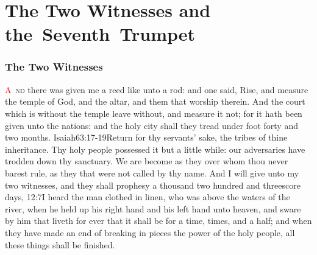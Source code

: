 
\chapter{The Two Witnesses and \linebreak[0] \mbox{the Seventh Trumpet}}
\subsection*{The Two Witnesses}
\lettrine[lines=3,slope=0.5em]{\textcolor{red}{A}}{\ nd} there was given me a reed like unto a rod:%
 and one said, Rise, and measure the temple of God, and the altar, and them that worship therein. 
And the court which is without the temple leave without, and measure it not; for it hath been given unto the nations: and the holy city shall they tread under foot forty and two months.%
					{Isaiah}{63:17-19}{Return for thy servants’ sake, the tribes of thine inheritance. Thy holy people possessed it but a little while: our adversaries have trodden down thy sanctuary. We are become as they over whom thou never barest rule, as they that were not called by thy name.} %
And I will give unto my two witnesses, and they shall prophesy a thousand two hundred and threescore days,%
					{12:7}{I heard the man clothed in linen, who was above the waters of the river, when he held up his right hand and his left hand unto heaven, and sware by him that liveth for ever that it shall be for a time, times, and a half; and when they have made an end of breaking in pieces the power of the holy people, all these things shall be finished.}
